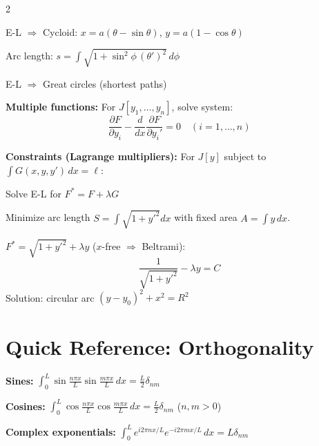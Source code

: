 \documentclass[10pt,a4paper]{article}
\begin{document}
\begin{multicols}{2}
\begin{example}[Brachistochrone]
E-L $\Rightarrow$ Cycloid: $x = a(\theta - \sin\theta)$, $y = a(1-\cos\theta)$
\end{example}

\begin{example}
Arc length: $\displaystyle s = \int\sqrt{1 + \sin^2\phi\,(\theta')^2}\,d\phi$

E-L $\Rightarrow$ Great circles (shortest paths)
\end{example}

\textbf{Multiple functions:} For $J[y_1,\ldots,y_n]$, solve system:
\begin{equation}
\frac{\partial F}{\partial y_i} - \frac{d}{dx}\frac{\partial F}{\partial y_i'} = 0 \quad (i=1,\ldots,n)
\end{equation}

\textbf{Constraints (Lagrange multipliers):}
For $J[y]$ subject to $\int G(x,y,y')\,dx = \ell$:

Solve E-L for $F^* = F + \lambda G$

\begin{example}
Minimize arc length $S = \int\sqrt{1+y'^2}dx$ with fixed area $A = \int y\,dx$.

$F^* = \sqrt{1+y'^2} + \lambda y$ ($x$-free $\Rightarrow$ Beltrami):
\begin{equation}
\frac{1}{\sqrt{1+y'^2}} - \lambda y = C
\end{equation}
Solution: circular arc $(y - y_0)^2 + x^2 = R^2$
\end{example}

\section{Quick Reference: Orthogonality}

\begin{keyformula}
\textbf{Sines:}
$\displaystyle\int_0^L \sin\frac{n\pi x}{L}\sin\frac{m\pi x}{L}\,dx = \frac{L}{2}\delta_{nm}$

\textbf{Cosines:}
$\displaystyle\int_0^L \cos\frac{n\pi x}{L}\cos\frac{m\pi x}{L}\,dx = \frac{L}{2}\delta_{nm}$ ($n,m>0$)

\textbf{Complex exponentials:}
$\displaystyle\int_0^L e^{i2\pi nx/L}e^{-i2\pi mx/L}\,dx = L\delta_{nm}$
\end{keyformula}

\vfill


\end{multicols}
\end{document}
